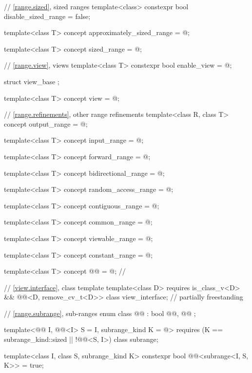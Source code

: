 \begin{codeblock}
{  // \ref{range.sized}, sized ranges
  template<class>
    constexpr bool disable_sized_range = false;

  template<class T>
    concept approximately_sized_range = @\seebelow@;

  template<class T>
    concept sized_range = @\seebelow@;

  // \ref{range.view}, views
  template<class T>
    constexpr bool enable_view = @\seebelow@;

  struct view_base {};

  template<class T>
    concept view = @\seebelow@;

  // \ref{range.refinements}, other range refinements
  template<class R, class T>
    concept output_range = @\seebelow@;

  template<class T>
    concept input_range = @\seebelow@;

  template<class T>
    concept forward_range = @\seebelow@;

  template<class T>
    concept bidirectional_range = @\seebelow@;

  template<class T>
    concept random_access_range = @\seebelow@;

  template<class T>
    concept contiguous_range = @\seebelow@;

  template<class T>
    concept common_range = @\seebelow@;

  template<class T>
    concept viewable_range = @\seebelow@;

  template<class T>
    concept constant_range = @\seebelow@;

  template<class T>
    concept @@ = @\seebelownc@;              // \expos

  // \ref{view.interface}, class template 
  template<class D>
    requires is_class_v<D> && @@<D, remove_cv_t<D>>
  class view_interface;                                         // partially freestanding

  // \ref{range.subrange}, sub-ranges
  enum class @@ : bool { @@, @@ };

  template<@@ I, @@<I> S = I, subrange_kind K = @\seebelow@>
    requires (K == subrange_kind::sized || !@@<S, I>)
  class subrange;

  template<class I, class S, subrange_kind K>
    constexpr bool @@<subrange<I, S, K>> = true;

}
\end{codeblock}
